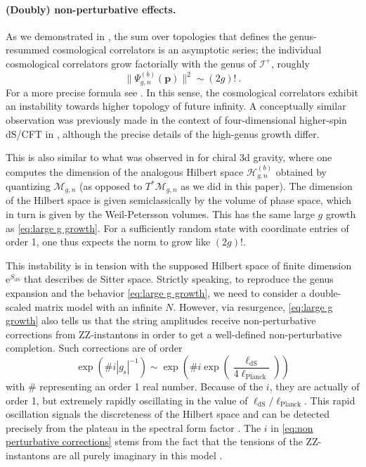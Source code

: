 \documentclass[12pt,a4paper]{article}
\newcommand{\be}{\begin{equation}}
\newcommand{\ee}{\end{equation}}
\begin{document}
\paragraph{(Doubly) non-perturbative effects.} As we demonstrated in \cite{paper3}, the sum over topologies that defines the genus-resummed cosmological correlators is an asymptotic series; the individual cosmological correlators grow factorially with the genus of $\mathcal{I}^+$, roughly
\begin{equation}
    \lVert\Psi_{g,n}^{(b)}(\boldsymbol{p})\rVert^2 \sim (2g)!~. \label{eq:large g growth}
\end{equation} 
For a more precise formula see \cite{paper3}.
In this sense, the cosmological correlators exhibit an instability towards higher topology of future infinity. A conceptually similar observation was previously made in the context of four-dimensional higher-spin dS/CFT in \cite{Banerjee:2013mca}, although the precise details of the high-genus growth differ. 

This is also similar to what was observed in \cite{Maloney:2015ina, Eberhardt:2022wlc} for chiral 3d gravity, where one computes the dimension of the analogous Hilbert space $\mathcal{H}_{g,n}^{(b)}$ obtained by quantizing $\mathcal{M}_{g,n}$ (as opposed to $T^*\mathcal{M}_{g,n}$ as we did in this paper). The dimension of the Hilbert space is given semiclassically by the volume of phase space, which in turn is given by the Weil-Petersson volumes. This has the same large $g$ growth as \eqref{eq:large g growth}. For a sufficiently random state with coordinate entries of order 1, one thus expects the norm to grow like $(2g)!$.

This instability is in tension with the supposed Hilbert space of finite dimension $\mathrm{e}^{S_\text{dS}}$ that describes de Sitter space. Strictly speaking, to reproduce the genus expansion and the behavior \eqref{eq:large g growth}, we need to consider a double-scaled matrix model with an infinite $N$. However, via resurgence, \eqref{eq:large g growth} also tells us that the string amplitudes receive non-perturbative corrections from ZZ-instantons in order to get a well-defined non-perturbative completion. Such corrections are of order
\be 
\exp(\# i |g_\text{s}|^{-1})\sim\exp\left(\# i \exp\left(\frac{\ell_\text{dS}}{4 \ell_\text{Planck}}\right)\right) \label{eq:non perturbative corrections} 
\ee
with $\#$ representing an order 1 real number. Because of the $i$, they are actually of order 1, but extremely rapidly oscillating in the value of $\ell_\text{dS}/\ell_\text{Planck}$. This rapid oscillation signals the discreteness of the Hilbert space and can be detected precisely from the plateau in the spectral form factor \cite{Cotler:2016fpe}. The $i$ in \eqref{eq:non perturbative corrections} stems from the fact that the tensions of the ZZ-instantons are all purely imaginary in this model \cite{paper3}.
\end{document}
